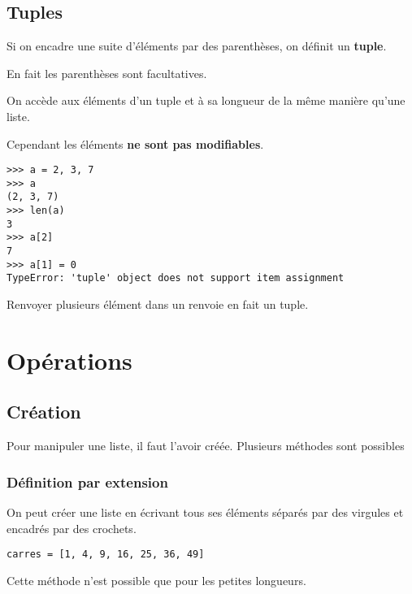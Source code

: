 \subsection{Tuples}
Si on encadre une suite d'éléments par des parenthèses, on définit un {\bf tuple}.

En fait les parenthèses sont facultatives.

On accède aux éléments d'un tuple et à sa longueur de la même manière qu'une liste. 

Cependant les éléments {\bf ne sont pas modifiables}.

\begin{lstlisting}
>>> a = 2, 3, 7
>>> a
(2, 3, 7)
>>> len(a)
3
>>> a[2]
7
>>> a[1] = 0
TypeError: 'tuple' object does not support item assignment
\end{lstlisting}
Renvoyer plusieurs élément dans un  renvoie en fait un tuple.
\section{Opérations}
\subsection{Création}
Pour manipuler une liste, il faut l'avoir créée.
Plusieurs méthodes sont possibles
\subsubsection{Définition par extension}
On  peut créer une liste en écrivant tous ses éléments séparés par des virgules et encadrés par des crochets.
\begin{lstlisting}
carres = [1, 4, 9, 16, 25, 36, 49]
\end{lstlisting}
Cette méthode n'est possible que pour les petites longueurs.

